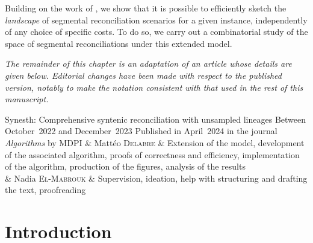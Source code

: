 Building on the work of \textcite{LibeskindHadas2014ParetoOptimalPhylogenetic}, we show that it is possible to efficiently sketch the \emph{landscape} of segmental reconciliation scenarios for a given instance, independently of any choice of specific costs.
To do so, we carry out a combinatorial study of the space of segmental reconciliations under this extended model.

\emph{The remainder of this chapter is an adaptation of an article whose details are given below. Editorial changes have been made with respect to the published version, notably to make the notation consistent with that used in the rest of this manuscript.}

\articlemeta%
    {Synesth: Comprehensive syntenic reconciliation with unsampled lineages}%
    {Between October~2022 and December~2023}%
    {Published in April~2024 in the journal \emph{Algorithms} by MDPI}%
    {& Mattéo \textsc{Delabre} & Extension of the model, development of the associated algorithm, proofs of correctness and efficiency, implementation of the algorithm, production of the figures, analysis of the results \\
    \cmidrule(l){2-3}
    & Nadia \textsc{El-Mabrouk} & Supervision, ideation, help with structuring and drafting the text, proofreading}

\newcommand{\augS}{\speciesTree^*}
\newcommand{\allEvents}{\mathcal{E}}
\newcommand{\Hist}{\mathcal{H}}
\newcommand{\histCost}{\mathrm{c}}
\newcommand{\targetChild}{_\mathrm{t}}
\newcommand{\conservChild}{_\mathrm{k}}
\newcommand{\solSpace}{\mathbb{H}}
\newcommand{\minSolSpace}{\solSpace^{\mathrm{min}}}
\newcommand{\eventVec}{\mathrm{ev}}
\newcommand{\paretoMin}[1]{\min{}_{#1}\,}
\newcommand{\minVecSet}{\eventVec^{\mathrm{min}}}
\newcommand{\makeNode}[1]{[#1]}
\newcommand{\optPath}{\mathrm{hist}}
\newcommand{\histExt}{\preceq}
\newcommand{\gainAt}{\mathrm{gain}}
\newcommand{\syntenyMinAt}{\syntenyOf^{\mathrm{min}}}
\newcommand{\minCost}{c^{\mathrm{min}}}
\newcommand{\visLeaves}{\tleavs_V}


\section{Introduction}


